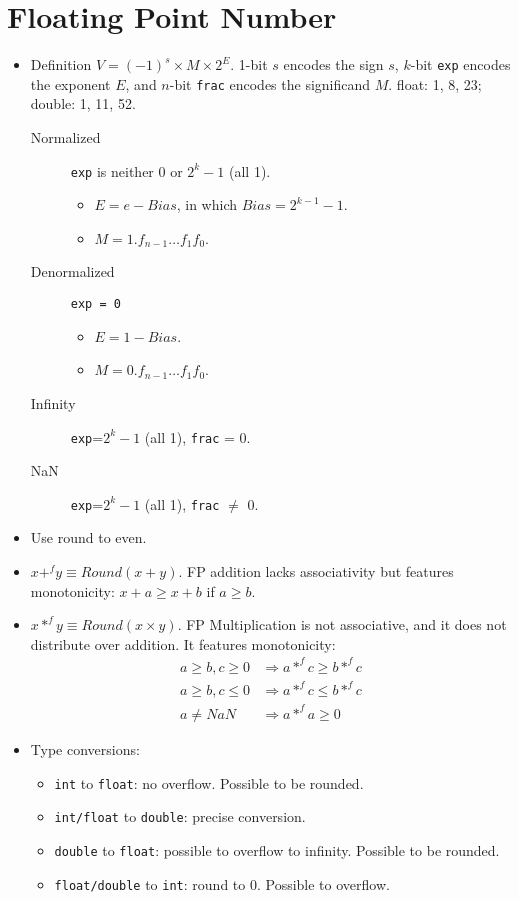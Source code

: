 \section{Floating Point Number}
\begin{itemize}
\item Definition $V=(-1)^s\times M \times 2^E$. 1-bit $s$ encodes the sign $s$, $k$-bit \texttt{exp} encodes the exponent $E$, and $n$-bit \texttt{frac} encodes the significand $M$. float: 1, 8, 23; double: 1, 11, 52.
 \begin{description}
 	\item[Normalized] \texttt{exp} is neither 0 or $2^k-1$ (all 1). 
 	\begin{itemize}
 		\item $E=e-Bias$, in which $Bias=2^{k-1}-1$. 
 		\item $M=1.f_{n-1}\dots f_1f_0$.
 	\end{itemize} 
 	\item[Denormalized] \texttt{exp = 0}
 	\begin{itemize}
 		\item $E=1-Bias$.
 		\item $M=0.f_{n-1}\dots f_1f_0$.
 	\end{itemize}
 	\item[Infinity] \texttt{exp}=$2^{k}-1$ (all 1), \texttt{frac} = 0.
 	\item[NaN] \texttt{exp}=$2^{k}-1$ (all 1), \texttt{frac} $\neq$ 0.
 \end{description}

\item Use round to even.
\item $x+^fy\equiv Round(x+y)$. FP addition lacks associativity but features monotonicity: $x+a\ge x+b$ if $a\ge b$.
\item $x*^fy\equiv Round(x\times y)$. FP Multiplication is not associative, and it does not distribute over addition. It features monotonicity:
\begin{align*}
a\ge b, c\ge 0 &\Rightarrow a * ^fc \ge b * ^fc\\
a\ge b, c\le 0 &\Rightarrow a * ^fc \le b * ^fc\\
a\neq NaN &\Rightarrow a * ^fa\ge 0
\end{align*}
\item Type conversions:
\begin{itemize}
	\item \texttt{int} to \texttt{float}: no overflow. Possible to be rounded.
	\item \texttt{int/float} to \texttt{double}: precise conversion.
	\item \texttt{double} to \texttt{float}: possible to overflow to infinity. Possible to be rounded.
	\item \texttt{float/double} to \texttt{int}: round to 0. Possible to overflow.
\end{itemize}
\end{itemize}
\ifx\PREAMBLE\undefined

\fi